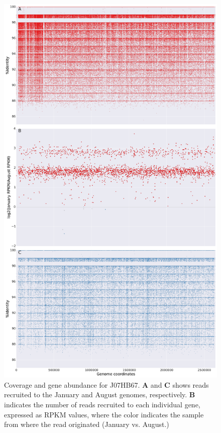 \begin{figure}[!hbtp]
  \centering
  \includegraphics[width=\textwidth,height=0.8\textheight,keepaspectratio]{Chapter5/Figures/coverage_plots/J07HB67_coverage.pdf}
  \caption{Coverage and gene abundance for J07HB67. \textbf{A} and \textbf{C} shows reads recruited to the January and August genomes, respectively. \textbf{B} indicates the number of reads recruited to each individual gene, expressed as RPKM values, where the color indicates the sample from where the read originated (January vs. August.)}
  \label{J07HB67coverage}
\end{figure}

